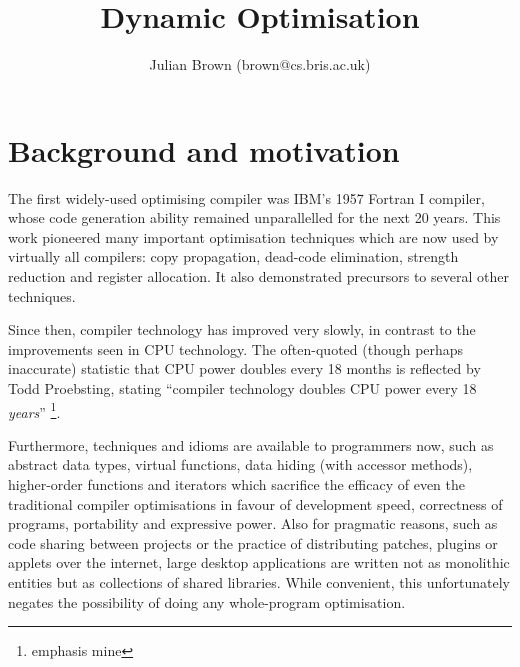 \documentclass[11pt,letterpaper,onecolumn,notitlepage]{article}
\begin{document}
\title{Dynamic Optimisation}
\author{Julian Brown (brown@cs.bris.ac.uk)}
\maketitle




\newenvironment{code}
  {\begin{list}{}{
    \setlength{\rightmargin}{\leftmargin}
    \raggedright
    \setlength{\itemsep}{0pt}
    \setlength{\parsep}{0pt}
    \ttfamily}%
   \item[]}
  {\end{list}}





% 


\cleardoublepage	%


\section{Background and motivation}

The first widely-used optimising compiler was IBM's 1957 Fortran I compiler, whose code generation ability remained unparallelled for the next 20 years. This work pioneered many important optimisation techniques which are now used by virtually all compilers: copy propagation, dead-code elimination, strength reduction and register allocation. It also demonstrated precursors to several other techniques.

Since then, compiler technology has improved very slowly, in contrast to the improvements seen in CPU technology. The often-quoted (though perhaps inaccurate) statistic that CPU power doubles every 18 months is reflected by Todd Proebsting, stating ``compiler technology doubles CPU power every 18 {\em years}'' \footnote{emphasis mine}.

Furthermore, techniques and idioms are available to programmers now, such as abstract data types, virtual functions, data hiding (with accessor methods), higher-order functions and iterators which sacrifice the efficacy of even the traditional compiler optimisations in favour of development speed, correctness of programs, portability and expressive power. Also for pragmatic reasons, such as code sharing between projects or the practice of distributing patches, plugins or applets over the internet, large desktop applications are written not as monolithic entities but as collections of shared libraries. While convenient, this unfortunately negates the possibility of doing any whole-program optimisation.
\end{document}
